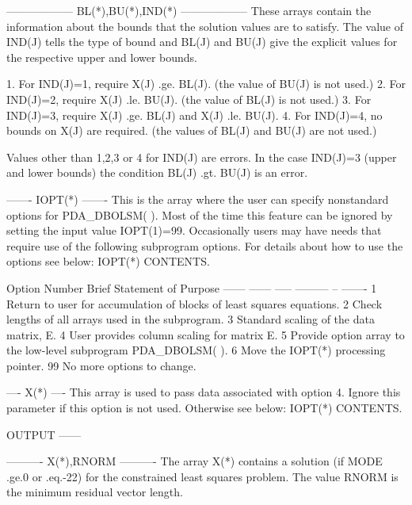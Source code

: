 \documentclass[11pt,twoside,nolof]{starlink}
\begin{document}
\begin{terminalv}
    ------------------
    BL(*),BU(*),IND(*)
    ------------------
     These arrays contain the information about the bounds that the
     solution values are to satisfy. The value of IND(J) tells the
     type of bound and BL(J) and BU(J) give the explicit values for
     the respective upper and lower bounds.

    1.    For IND(J)=1, require X(J) .ge. BL(J).
          (the value of BU(J) is not used.)
    2.    For IND(J)=2, require X(J) .le. BU(J).
          (the value of BL(J) is not used.)
    3.    For IND(J)=3, require X(J) .ge. BL(J) and
                                X(J) .le. BU(J).
    4.    For IND(J)=4, no bounds on X(J) are required.
          (the values of BL(J) and BU(J) are not used.)

     Values other than 1,2,3 or 4 for IND(J) are errors. In the case
     IND(J)=3 (upper and lower bounds) the condition BL(J) .gt. BU(J)
     is an error.

    -------
    IOPT(*)
    -------
     This is the array where the user can specify nonstandard options
     for PDA_DBOLSM( ). Most of the time this feature can be ignored by
     setting the input value IOPT(1)=99. Occasionally users may have
     needs that require use of the following subprogram options. For
     details about how to use the options see below: IOPT(*) CONTENTS.

     Option Number   Brief Statement of Purpose
     ------ ------   ----- --------- -- -------
           1         Return to user for accumulation of blocks
                     of least squares equations.
           2         Check lengths of all arrays used in the
                     subprogram.
           3         Standard scaling of the data matrix, E.
           4         User provides column scaling for matrix E.
           5         Provide option array to the low-level
                     subprogram PDA_DBOLSM( ).
           6         Move the IOPT(*) processing pointer.
          99         No more options to change.

    ----
    X(*)
    ----
     This array is used to pass data associated with option 4. Ignore
     this parameter if this option is not used. Otherwise see below:
     IOPT(*) CONTENTS.

    OUTPUT
    ------

    ----------
    X(*),RNORM
    ----------
     The array X(*) contains a solution (if MODE .ge.0 or .eq.-22) for
     the constrained least squares problem. The value RNORM is the
     minimum residual vector length.


\end{terminalv}
\end{document}
